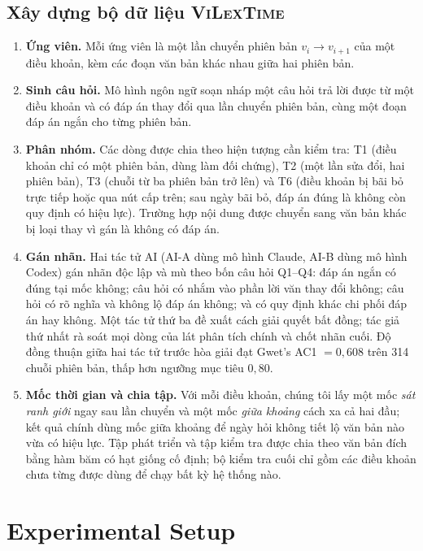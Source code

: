 \documentclass[11pt,a4paper]{article}
\newcommand{\sv}{\textsc{ViLexTime}}
\begin{document}
\subsection{Xây dựng bộ dữ liệu \sv{}}
\begin{enumerate}
  \item \textbf{Ứng viên.} Mỗi ứng viên là một lần chuyển phiên bản $v_i\to v_{i+1}$ của một điều khoản, kèm các đoạn văn bản khác nhau giữa hai phiên bản.
  \item \textbf{Sinh câu hỏi.} Mô hình ngôn ngữ soạn nháp một câu hỏi trả lời được từ một điều khoản và có đáp án thay đổi qua lần chuyển phiên bản, cùng một đoạn đáp án ngắn cho từng phiên bản.
  \item \textbf{Phân nhóm.} Các dòng được chia theo hiện tượng cần kiểm tra: T1 (điều khoản chỉ có một phiên bản, dùng làm đối chứng), T2 (một lần sửa đổi, hai phiên bản), T3 (chuỗi từ ba phiên bản trở lên) và T6 (điều khoản bị bãi bỏ trực tiếp hoặc qua nút cấp trên; sau ngày bãi bỏ, đáp án đúng là không còn quy định có hiệu lực). Trường hợp nội dung được chuyển sang văn bản khác bị loại thay vì gán là không có đáp án.
  \item \textbf{Gán nhãn.} Hai tác tử AI (AI-A dùng mô hình Claude, AI-B dùng mô hình Codex) gán nhãn độc lập và mù theo bốn câu hỏi Q1--Q4: đáp án ngắn có đúng tại mốc không; câu hỏi có nhắm vào phần lời văn thay đổi không; câu hỏi có rõ nghĩa và không lộ đáp án không; và có quy định khác chi phối đáp án hay không. Một tác tử thứ ba đề xuất cách giải quyết bất đồng; tác giả thứ nhất rà soát mọi dòng của lát phân tích chính và chốt nhãn cuối. Độ đồng thuận giữa hai tác tử trước hòa giải đạt Gwet's AC1 $=0{,}608$ trên 314 chuỗi phiên bản, thấp hơn ngưỡng mục tiêu $0{,}80$.
  \item \textbf{Mốc thời gian và chia tập.} Với mỗi điều khoản, chúng tôi lấy một mốc \emph{sát ranh giới} ngay sau lần chuyển và một mốc \emph{giữa khoảng} cách xa cả hai đầu; kết quả chính dùng mốc giữa khoảng để ngày hỏi không tiết lộ văn bản nào vừa có hiệu lực. Tập phát triển và tập kiểm tra được chia theo văn bản đích bằng hàm băm có hạt giống cố định; bộ kiểm tra cuối chỉ gồm các điều khoản chưa từng được dùng để chạy bất kỳ hệ thống nào.
\end{enumerate}

\section{Experimental Setup}
\end{document}
